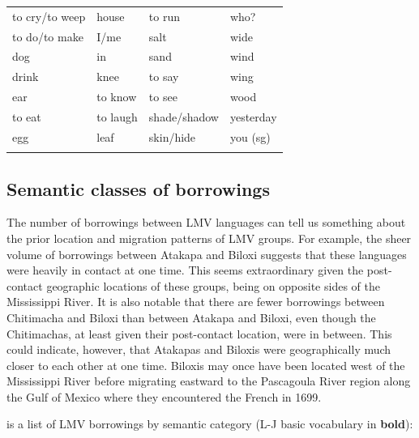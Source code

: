 \documentclass[output=paper]{LSP/langsci}
\begin{document}
\begin{table}
\begin{tabular}{llll}
 to cry/to weep          &      house                 &         to run        &      who? \\
 to do/to make           &      I/me                  &         salt          &      wide \\
 dog                     &      in                    &         sand          &      wind \\
 drink                   &      knee                  &         to say        &      wing \\
 ear                     &      to know               &         to see        &      wood \\
 to eat                  &      to laugh              &         shade/shadow  &      yesterday\\
  egg                    &     leaf                   &          skin/hide    &     you (sg) \\
       \lspbottomrule
\end{tabular}                                                                 
\end{table}

\subsection{Semantic classes of borrowings}
	
	The number of borrowings between LMV languages can tell us something about the prior location and migration patterns of LMV groups. For example, the sheer volume of borrowings between Atakapa and Biloxi suggests that these languages were heavily in contact at one time. This seems extraordinary given the post-contact geographic locations of these groups, being on opposite sides of the Mississippi River. It is also notable that there are fewer borrowings between Chitimacha and Biloxi than between Atakapa and Biloxi, even though the Chitimachas, at least given their post-contact location, were in between. This could indicate, however, that Atakapas and Biloxis were geographically much closer to each other at one time. Biloxis may once have been located west of the Mississippi River before migrating eastward to the Pascagoula River region along the Gulf of Mexico where they encountered the French in 1699.

	 is a list of LMV borrowings by semantic category (L-J basic vocabulary in \textbf{bold}): 
\end{document}
